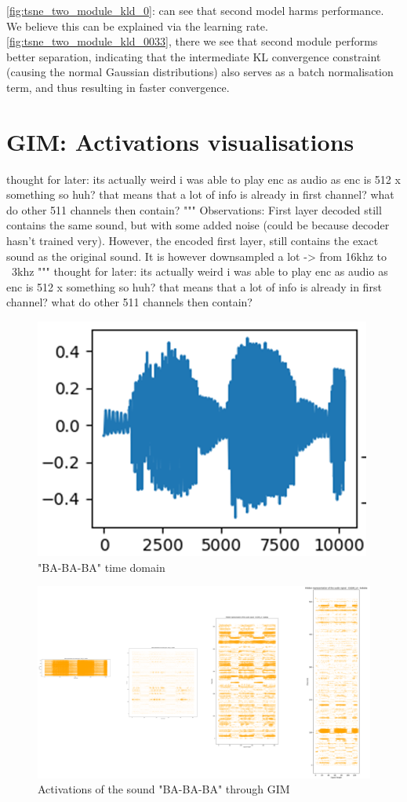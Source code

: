 \ref{fig:tsne_two_module_kld_0}: can see that second model harms performance. We believe this can be explained via the learning rate. \ref{fig:tsne_two_module_kld_0033}, there we see that second module performs better separation, indicating that the intermediate KL convergence constraint (causing the normal Gaussian distributions) also serves as a batch normalisation term, and thus resulting in faster convergence.




\section{GIM: Activations visualisations}

thought for later: its actually weird i was able to play enc as audio as enc is 512 x something
so huh? that means that a lot of info is already in first channel? what do other 511 channels then contain?
"""
Observations:
First layer decoded still contains the same sound, but with some added noise (could be because decoder hasn't trained very).
However, the encoded first layer, still contains the exact sound as the original sound. It is however downsampled a lot -> from 16khz to ~3khz
"""
thought for later: its actually weird i was able to play enc as audio as enc is 512 x something
so huh? that means that a lot of info is already in first channel? what do other 511 channels then contain?



\begin{figure}[h]
	\centering
	\includegraphics[width=0.7\linewidth]{screenshot007}
	\caption{"BA-BA-BA" time domain}
	\label{fig:screenshot007}
\end{figure}

\begin{figure}[h]
	\centering
	\includegraphics[width=0.7\linewidth]{screenshot006}
	\caption{Activations of the sound "BA-BA-BA" through GIM}
	\label{fig:gim latent activations}
\end{figure}

